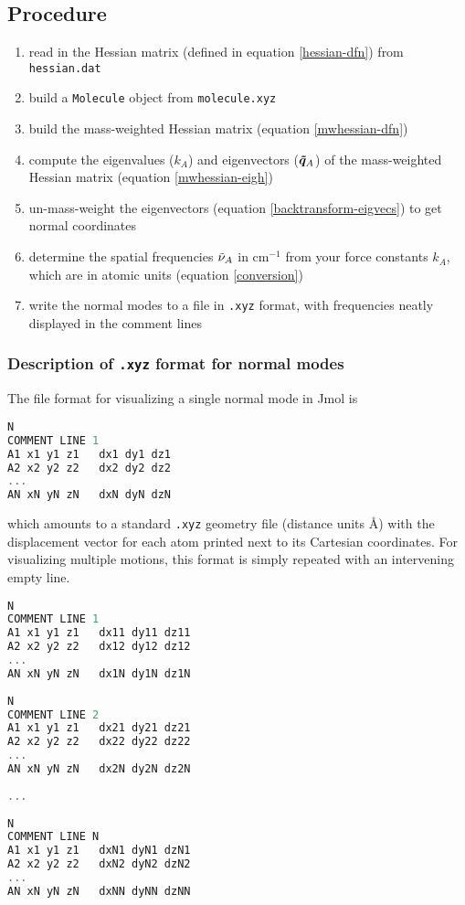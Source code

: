 \documentclass[fleqn]{article}
\newcommand{\linl}[1]{\lstinline{#1}{}}
\newcommand{\n}{\nu}         %
\newcommand{\tl}{\ensuremath{\tilde}}
\newcommand{\mr}[1]{\ensuremath{\mathrm{#1}}}
\begin{document}
\subsection*{Procedure}

\begin{enumerate}
  \item read in the Hessian matrix (defined in equation \ref{hessian-dfn}) from \linl{hessian.dat}
  \item build a \linl{Molecule} object from \linl{molecule.xyz}
  \item build the mass-weighted Hessian matrix (equation \ref{mwhessian-dfn})
  \item compute the eigenvalues ($k_A$) and eigenvectors ($\bm{\tl{q}}_A$) of the mass-weighted Hessian matrix (equation \ref{mwhessian-eigh})
  \item un-mass-weight the eigenvectors (equation \ref{backtransform-eigvecs}) to get normal coordinates
  \item determine the spatial frequencies $\tl{\n}_A$ in $\mr{cm}^{-1}$ from your force constants $k_A$, which are in atomic units (equation \ref{conversion})
  \item write the normal modes to a file in \linl{.xyz} format, with frequencies neatly displayed in the comment lines
\end{enumerate}


\newpage
\subsubsection*{Description of \linl{.xyz} format for normal modes}
The file format for visualizing a single normal mode in Jmol is
\begin{addmargin}{5cm}{}
\begin{lstlisting}[language=c++]
N
COMMENT LINE 1
A1 x1 y1 z1   dx1 dy1 dz1
A2 x2 y2 z2   dx2 dy2 dz2
...                        
AN xN yN zN   dxN dyN dzN
\end{lstlisting}
\end{addmargin}
which amounts to a standard \linl{.xyz} geometry file (distance units \AA) with the displacement vector for each atom printed next to
its Cartesian coordinates. For visualizing multiple motions, this format is
simply repeated with an intervening empty line.
\begin{addmargin}{5cm}{}
\begin{lstlisting}[language=c++]
N
COMMENT LINE 1
A1 x1 y1 z1   dx11 dy11 dz11
A2 x2 y2 z2   dx12 dy12 dz12
...                        
AN xN yN zN   dx1N dy1N dz1N
                           
N                          
COMMENT LINE 2             
A1 x1 y1 z1   dx21 dy21 dz21
A2 x2 y2 z2   dx22 dy22 dz22
...                        
AN xN yN zN   dx2N dy2N dz2N
                           
...                        
                           
N                          
COMMENT LINE N             
A1 x1 y1 z1   dxN1 dyN1 dzN1
A2 x2 y2 z2   dxN2 dyN2 dzN2
...                        
AN xN yN zN   dxNN dyNN dzNN
\end{lstlisting}
\end{addmargin}
\end{document}
